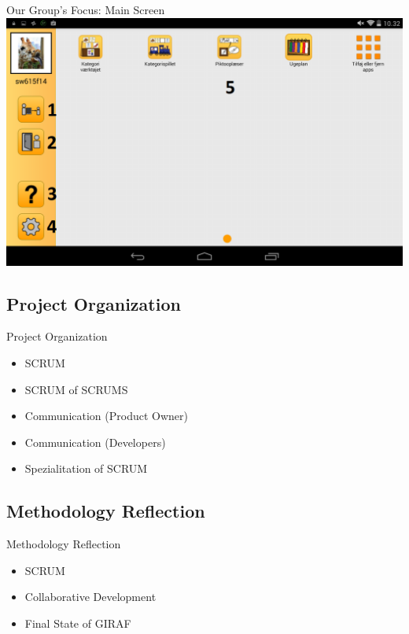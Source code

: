 \begin{frame}{Our Group's Focus: Main Screen}
\includegraphics[scale=0.28]{figures/MenuGuardian.png} 
\end{frame}

\subsection{Project Organization}
\begin{frame}{Project Organization}
\begin{itemize} 
	\item SCRUM
	\item SCRUM of SCRUMS
	\item Communication (Product Owner)
	\item Communication (Developers)
	\item Spezialitation of SCRUM
\end{itemize}
\end{frame}

\subsection{Methodology Reflection}
\begin{frame}{Methodology Reflection}
\begin{itemize} 
	\item SCRUM
	\item Collaborative Development
	\item Final State of GIRAF
\end{itemize}
\end{frame}
















